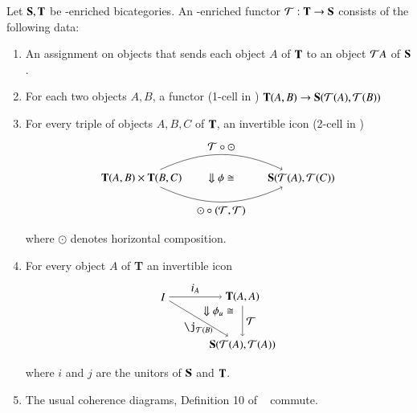 \begin{defn}\label{def:Iconfunc}
Let ${\bf S,T}$ be \Icon-enriched bicategories. An \Icon-enriched functor $\mathcal{T}: {\bf T} \rightarrow {\bf S}$ consists of the following data:
\begin{enumerate}
\item An assignment on objects that sends each object $A$ of ${\bf T}$ to an object $\mathcal{T} A$ of ${\bf S}$.
\item For each two objects $A,B$, a functor (1-cell in \Icon) ${\bf T}(A,B) \rightarrow {\bf S}(\mathcal{T}(A),\mathcal{T}(B))$
\item For every triple of objects $A,B,C$ of ${\bf T}$, an invertible icon (2-cell in \Icon) 
\begin{align} 
\begin{tikzpicture}
\node(1) at (0,0) {${\bf T}(A,B) \times {\bf T}(B,C)$};
\node(2) at (5,0) {${\bf S}(\cT(A),\cT(C))$};
\draw[->] (1) to[in=155, out=25] node[above]{$\cT \circ \odot$} (2); 
\draw[->] (1) to[in=-155, out=-25] node[below]{$\odot \circ (\cT,\cT)$} (2); 
\node at (2.5,0) {$\Downarrow \phi \iso$};
\end{tikzpicture}
\end{align}
where $\odot$ denotes horizontal composition.
\item For every object $A$ of {\bf T} an invertible icon
\begin{align}
\begin{tikzpicture}[xscale=.5, yscale=.3]
\node(1) at (0,0) {$I$};
\node(2) at (5,0) {${\bf T}(A,A)$};
\node(3) at (5,-5) {${\bf S}(\cT(A),\cT(A))$};
\draw[->] (1) to node[above]{$i_{A}$} (2); 
\draw[->] (1) to node[below]{$\j_{\cT(B)}$} (3);
\draw[->] (2) to node[right]{$\cT$} (3); 
\node at (3.5,-1.5) {$\Downarrow \phi_u \iso$};
\end{tikzpicture}
\end{align}
where $i$ and $j$ are the unitors of ${\bf S}$ and ${\bf T}$.
\item The usual coherence diagrams, Definition 10 of ~\cite{nick:tricatsbook} commute.
\end{enumerate}
\end{defn}

